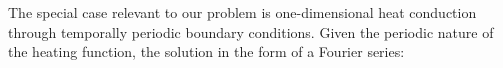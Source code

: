 \documentclass[12pt,a4]{article}
\begin{document}
The special case relevant to our problem is one-dimensional heat conduction through temporally periodic boundary conditions. Given the periodic nature of the heating function, the solution in the form of a Fourier series:
\end{document}
